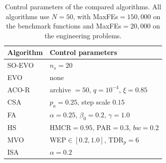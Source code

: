 \begin{table}[htbp]
\centering\small
\caption{Control parameters of the compared algorithms. All algorithms use $N=50$,
  with MaxFEs$=150{,}000$ on the benchmark functions and MaxFEs$=20{,}000$ on the
  engineering problems.}
\label{tab:params}
\begin{tabular}{ll}
\toprule
Algorithm & Control parameters \\
\midrule
SO-EVO & $n_s=20$ \\
EVO~\cite{Azizi2023} & none \\
ACO-R~\cite{Socha2008} & archive $=50$, $q=10^{-4}$, $\xi=0.85$ \\
CSA~\cite{YangDeb2009} & $p_a=0.25$, step scale $0.15$ \\
FA~\cite{Yang2010b} & $\alpha=0.25$, $\beta_0=0.2$, $\gamma=1.0$ \\
HS~\cite{Geem2001} & HMCR$=0.95$, PAR$=0.3$, $bw=0.2$ \\
MVO~\cite{Mirjalili2016} & WEP$\in[0.2,1.0]$, TDR$_p=6$ \\
ISA~\cite{Gandomi2014} & $\alpha=0.2$ \\
\bottomrule
\end{tabular}
\end{table}
